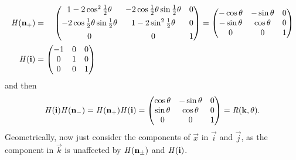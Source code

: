 \documentclass[fleqn,a4paper,11pt]{article}
\begin{document}
\begin{enumerate}[label=\textbf{\arabic*.}]
\begin{enumerate}[label=(\alph*)]
\begin{alignat*}
       \mat H(\vec n_+)
        &={}&
        \begin{pmatrix}
         1 - 2\cos^2\tfrac 12\theta & -2 \cos\tfrac 12\theta\sin\tfrac 12\theta
          & 0 \\[1ex]
         -2 \cos\tfrac 12\theta\sin\tfrac 12\theta & 1 - 2\sin^2\tfrac 12\theta
          & 0 \\[1ex]
         0 & 0 & 1
        \end{pmatrix}
        &=
        \begin{pmatrix}
         -\cos\theta & -\sin\theta & 0 \\
         -\sin \theta & \cos\theta & 0 \\
         0 & 0 & 1
        \end{pmatrix} \\
       \mat H(\vec i)
        &=
        \mathrlap{
         \begin{pmatrix}
          -1 & 0 & 0 \\
          0 & 1 & 0 \\
          0 & 0 & 1
         \end{pmatrix}
        }
      \end{alignat*}
      and then
      \begin{equation*}
       \mathit{H}(\mathrm{\mathbf{i}}) \mathit{H}(\mathrm{\mathbf{n}}_-) =
        \mathit{H}(\mathrm{\mathbf{n}}_+) \mathit{H}(\mathrm{\mathbf{i}})
         =
         \begin{pmatrix}
          \cos\theta & -\sin\theta & 0 \\
          \sin\theta & \cos\theta & 0 \\
          0 & 0 & 1
         \end{pmatrix}
         = \mathit{R}(\mathrm{\mathbf{k}}, \theta).
      \end{equation*}
      Geometrically, now just consider the components of \(\vec x\)
      in \(\vec i\) and \(\vec j\), as the component in
      \(\vec k\) is unaffected by \(\mathit{H}(\mathrm{\mathbf{n}}_\pm)\) and \(\mathit{H}(\mathrm{\mathbf{i}})\).


\end{enumerate}
\end{enumerate}
\end{document}
